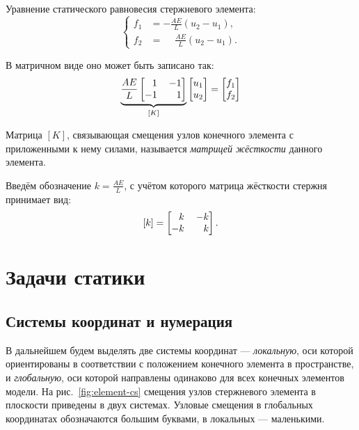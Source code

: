 \documentclass[10pt]{article}
\numberwithin{equation}{section}
\newcommand{\neword}{\emph}
\newcommand{\matr}[1]{[#1]}
\newcommand{\figref}[1]{рис. \ref{#1}}
\newcommand{\mm}{\llap{$-$}}
\newcommand{\phm}{\phantom{-}}
\begin{document}
Уравнение статического равновесия стержневого элемента:
\begin{equation}
  \begin{cases}
    f_1 &= -\frac{AE}{L}(u_2-u_1),\\
    f_2 &= \phm\frac{AE}{L}(u_2-u_1).
  \end{cases}
\end{equation}

В матричном виде оно может быть записано так:
\begin{equation}
  \label{eq:bar-equil}
  \underbrace{
  \frac{AE}{L}
  \begin{bmatrix}
    \phm{}1 && \mm1\\
    -1 && 1
  \end{bmatrix}}_{\matr{K}}
  \begin{bmatrix}
    u_1\\
    u_2
  \end{bmatrix}
  =
  \begin{bmatrix}
    f_1\\
    f_2
  \end{bmatrix}
\end{equation}

Матрица $\matr{K}$, связывающая смещения узлов конечного элемента с
приложенными к нему силами, называется \neword{матрицей жёсткости}
данного элемента. 

Введём обозначение $k = \frac{AE}{L}$, с учётом которого матрица
жёсткости стержня принимает вид:
\begin{equation}
  \label{eq:bar-stiffness}
  \matr{k} =
  \begin{bmatrix}
    \phm{}k&& \mm k\\
    -k && k
  \end{bmatrix}.
\end{equation}

\clearpage
\section{Задачи статики}

\subsection{Системы координат и нумерация}
\label{sec:notation}

В дальнейшем будем выделять две системы координат —
\neword{локальную}, оси которой ориентированы в соответствии с
положением конечного элемента в пространстве, и \neword{глобальную},
оси которой направлены одинаково для всех конечных элементов модели.
На \figref{fig:element-cs} смещения узлов стержневого элемента в
плоскости приведены в двух системах. Узловые смещения в глобальных
координатах обозначаются большим буквами, в локальных — маленькими.
\end{document}
